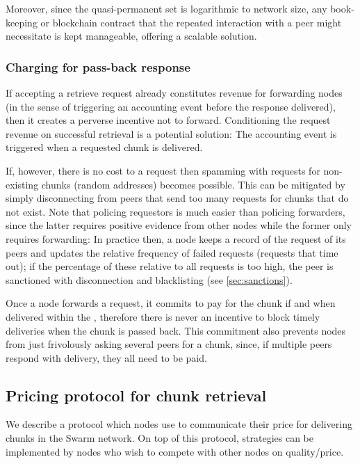 Moreover, since the quasi-permanent set is logarithmic to network size, any book-keeping or blockchain contract that the repeated interaction with a peer might necessitate is kept manageable, offering a scalable solution.

\subsubsection{Charging for pass-back response}

If accepting a retrieve request already constitutes revenue for forwarding nodes (in the sense of triggering an accounting event before the response delivered), then it creates a perverse incentive not to forward. Conditioning the request revenue on successful retrieval is a potential solution: The accounting event is triggered when a requested chunk is delivered.

If, however, there is no cost to a request then spamming with requests for non-existing chunks (random addresses) becomes possible. This can be mitigated by simply disconnecting from peers that send too many requests for chunks that do not exist. Note that policing requestors is much easier than policing forwarders, since the latter requires positive evidence from other nodes while the former only requires forwarding: In practice then, a node keeps a record of the request of its peers and updates the relative frequency of failed requests (requests that time out); if the percentage of these relative to all requests is too high, the peer is sanctioned with disconnection and blacklisting (see \ref{sec:sanctions}).

Once a node forwards a request, it commits to pay for the chunk if and when delivered within the , therefore there is never an incentive to block timely deliveries when the chunk is passed back.  This commitment also prevents nodes from just frivolously asking several peers for a chunk, since, if  multiple peers respond with delivery, they all need to be paid.


\subsection{Pricing protocol for chunk retrieval}\label{sec:pricing}

\green{}

We describe a protocol which nodes use to communicate their price for delivering chunks in the Swarm network. On top of this protocol, strategies can be implemented by nodes who wish to compete with other nodes on quality/price. 

